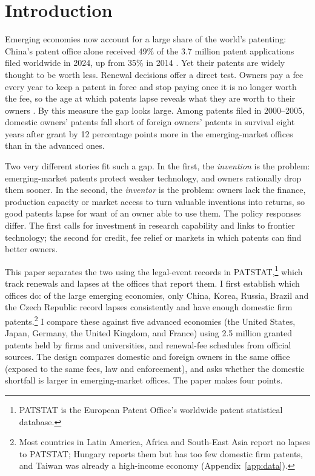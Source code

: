 \section{Introduction}

Emerging economies now account for a large share of the world's patenting: China's patent office alone received
49\% of the 3.7 million patent applications filed worldwide in 2024, up from 35\% in 2014 \citep{WIPO2025}. Yet
their patents are widely thought to be worth less. Renewal decisions offer a direct test. Owners pay a fee every year to keep a patent in force and stop paying
once it is no longer worth the fee, so the age at which patents lapse reveals what they are worth to their owners
\citep{PakesSchankerman1984,Pakes1986,SchankermanPakes1986}. By this measure the gap looks large. Among patents
filed in 2000--2005, domestic owners' patents fall short of foreign owners' patents in survival eight years after
grant by 12 percentage points more in the emerging-market offices than in the advanced ones.

Two very different stories fit such a gap. In the first, the \emph{invention} is the problem: emerging-market
patents protect weaker technology, and owners rationally drop them sooner. In the second, the \emph{inventor} is
the problem: owners lack the finance, production capacity or market access to turn valuable inventions into
returns, so good patents lapse for want of an owner able to use them. The policy responses differ. The first calls
for investment in research capability and links to frontier technology; the second for credit, fee relief or
markets in which patents can find better owners.

This paper separates the two using the legal-event records in PATSTAT,\footnote{PATSTAT is the European Patent Office's worldwide patent statistical database.} which track renewals and lapses at the
offices that report them. I first establish which offices do: of the large emerging economies, only China, Korea,
Russia, Brazil and the Czech Republic record lapses consistently and have enough domestic firm
patents.\footnote{Most countries in Latin America, Africa and South-East Asia report no lapses
to PATSTAT; Hungary reports them but has too few domestic firm patents, and Taiwan was already a high-income economy (Appendix~\ref{app:data}).}
I compare these against five advanced economies (the United States, Japan, Germany, the United Kingdom, and France) using 2.5 million granted patents held by firms and universities, and renewal-fee schedules from official sources. The design compares domestic and foreign owners in the same office (exposed to the same fees, law and
enforcement), and asks whether the domestic shortfall is larger in emerging-market offices. The paper makes four
points.


